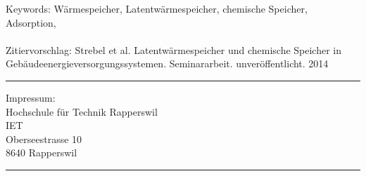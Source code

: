  \vspace*{12.5cm}
\begin{minipage}{80mm}
	Keywords: Wärmespeicher, Latentwärmespeicher, chemische Speicher, Adsorption,
 \\
	\\
	Zitiervorschlag: 
	Strebel et al. Latentwärmespeicher und chemische Speicher in
	Gebäudeenergieversorgungssystemen. Seminararbeit. unveröffentlicht. 2014
	\vspace{1cm}


  \rule{80mm}{2pt}
  Impressum: \\
  Hochschule für Technik Rapperswil \\
  IET \\ 
  Oberseestrasse 10 \\
  8640 Rapperswil\\
  \rule{80mm}{2pt}
\end{minipage}
\newpage

